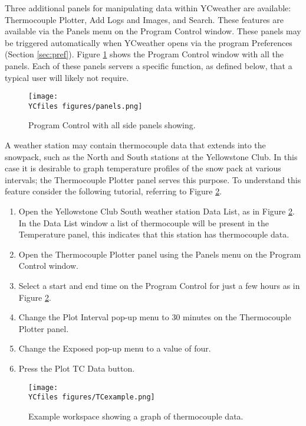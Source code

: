 \label{sec:panels}
Three additional panels for manipulating data within YCweather are available: Thermocouple Plotter, Add Logs and Images, and Search.  These features are available via the Panels menu on the Program Control window.  These panels may be triggered automatically when YCweather opens via the program Preferences (Section \ref{sec:pref}).  Figure \ref{fig:panels} shows the Program Control window with all the panels.  Each of these panels servers a specific function, as defined below, that a typical user will likely not require.

\begin{figure}[h]\centering
	\texttt{[image: \\YCfiles figures/panels.png]}
	\caption{Program Control with all side panels showing.}
	\label{fig:panels}
\end{figure}

A weather station may contain thermocouple data that extends into the snowpack, such as the North and South stations at the Yellowstone Club.  In this case it is desirable to graph temperature profiles of the snow pack at various intervals; the Thermocouple Plotter panel serves this purpose.  To understand this feature consider the following tutorial, referring to Figure \ref{fig:TCexample}.

\begin{enumerate}
	\item Open the Yellowstone Club South weather station Data List, as in Figure \ref{fig:TCexample}.  In the Data List window a list of thermocouple will be present in the Temperature panel, this indicates that this station has thermocouple data.
	\item Open the Thermocouple Plotter panel using the Panels menu on the Program Control window.
	\item Select a start and end time on the Program Control for just a few hours as in Figure \ref{fig:TCexample}.
	\item Change the Plot Interval pop-up menu to 30 minutes on the Thermocouple Plotter panel.
	\item Change the Exposed pop-up menu to a value of four.
	\item Press the Plot TC Data button.
\end{enumerate}

\begin{figure}[ht!]\centering
	\texttt{[image: \\YCfiles figures/TCexample.png]}
	\caption{Example workspace showing a graph of thermocouple data.}
	\label{fig:TCexample}
\end{figure}

